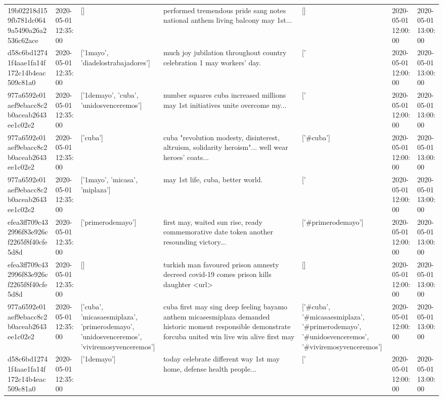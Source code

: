 \begin{tabular}{lllllll}
19b02218d159fb781dc0649a5490a26a2536c62ace & 2020-05-01 12:35:00 & [] & performed tremendous pride sang notes national anthem living balcony may 1st... & [] & 2020-05-01 12:00:00 & 2020-05-01 13:00:00 \\
d58c6bd12741f4aae1fa14f172c14b4eac509c81a0 & 2020-05-01 12:35:00 & ['1mayo', 'diadelostrabajadores'] & much joy jubilation throughout country celebration 1 may workers' day. & ['#1mayo', '#diadelostrabajadores'] & 2020-05-01 12:00:00 & 2020-05-01 13:00:00 \\
977a6592e01aef9ebacc8c2b0aceab2643ee1c02e2 & 2020-05-01 12:35:00 & ['1demayo', 'cuba', 'unidosvenceremos'] & number squares cuba increased millions may 1st initiatives unite overcome my... & ['#1demayo', '#cuba', '#unidosvenceremos'] & 2020-05-01 12:00:00 & 2020-05-01 13:00:00 \\
977a6592e01aef9ebacc8c2b0aceab2643ee1c02e2 & 2020-05-01 12:35:00 & ['cuba'] & cuba "revolution modesty, disinterest, altruism, solidarity heroism"... well wear heroes' coats... & ['#cuba'] & 2020-05-01 12:00:00 & 2020-05-01 13:00:00 \\
977a6592e01aef9ebacc8c2b0aceab2643ee1c02e2 & 2020-05-01 12:35:00 & ['1mayo', 'micasa', 'miplaza'] & may 1st life, cuba, better world. & ['#1mayo', '#micasa', '#miplaza'] & 2020-05-01 12:00:00 & 2020-05-01 13:00:00 \\
efea3ff709c432996f83e926cf2265f8f40cfe5d8d & 2020-05-01 12:35:00 & ['primerodemayo'] & first may, waited sun rise, ready commemorative date token another resounding victory... & ['#primerodemayo'] & 2020-05-01 12:00:00 & 2020-05-01 13:00:00 \\
efea3ff709c432996f83e926cf2265f8f40cfe5d8d & 2020-05-01 12:35:00 & [] & turkish man favoured prison amnesty decreed covid-19 comes prison kills daughter <url> & [] & 2020-05-01 12:00:00 & 2020-05-01 13:00:00 \\
977a6592e01aef9ebacc8c2b0aceab2643ee1c02e2 & 2020-05-01 12:35:00 & ['cuba', 'micasaesmiplaza', 'primerodemayo', 'unidosvenceremos', 'viviremosyvenceremos'] & cuba first may sing deep feeling bayamo anthem micasesmiplaza demanded historic moment responsible demonstrate forcuba united win live win alive first may & ['#cuba', '#micasaesmiplaza', '#primerodemayo', '#unidosvenceremos', '#viviremosyvenceremos'] & 2020-05-01 12:00:00 & 2020-05-01 13:00:00 \\
d58c6bd12741f4aae1fa14f172c14b4eac509c81a0 & 2020-05-01 12:35:00 & ['1demayo'] & today celebrate different way 1st may home, defense health people... & ['#1demayo'] & 2020-05-01 12:00:00 & 2020-05-01 13:00:00 \\

\end{tabular}
